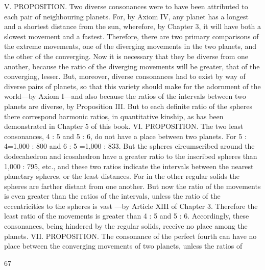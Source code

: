 \documentclass{article}
\begin{document}
V. PROPOSITION. Two diverse consonances were to have been
attributed to each pair of neighbouring planets.
For, by Axiom IV, any planet has a longest and a shortest distance from
the sun, wherefore, by Chapter 3, it will have both a slowest movement
and a fastest. Therefore, there are two primary comparisons of the
extreme movements, one of the diverging movements in the two planets,
and the other of the converging. Now it is necessary that they be diverse
from one another, because the ratio of the diverging movements will be
greater, that of the converging, lesser. But, moreover, diverse
consonances had to exist by way of diverse pairs of planets, so that this
variety should make for the adornment of the world—by Axiom I—and
also because the ratios of the intervals between two planets are diverse,
by Proposition III. But to each definite ratio of the spheres there
correspond harmonic ratios, in quantitative kinship, as has been
demonstrated in Chapter 5 of this book.
VI. PROPOSITION. The two least consonances, 4 : 5 and 5 : 6, do not
have a place between two planets.
For
5 : 4=1,000 : 800
and
6 : 5 =1,000 : 833.
But the spheres circumscribed around the dodecahedron and
icosahedron have a greater ratio to the inscribed spheres than 1,000 :
795, etc., and these two ratios indicate the intervals between the nearest
planetary spheres, or the least distances. For in the other regular solids
the spheres are farther distant from one another. But now the ratio of the
movements is even greater than the ratios of the intervals, unless the
ratio of the eccentricities to the spheres is vast —by Article XIII of
Chapter 3. Therefore the least ratio of the movements is greater than 4 :
5 and 5 : 6. Accordingly, these consonances, being hindered by the
regular solids, receive no place among the planets. VII.
PROPOSITION. The consonance of the perfect fourth can have no place
between the converging movements of two planets, unless the ratios of


67
\end{document}
